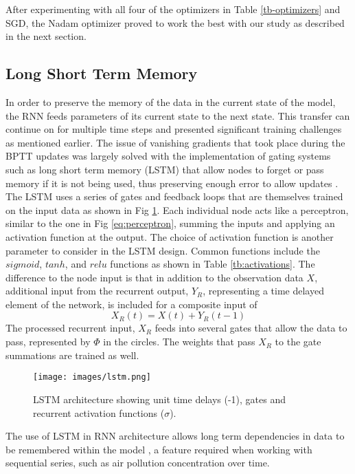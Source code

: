 \documentclass[preprint,12pt,a4paper,authoryear]{elsarticle}
\begin{document}
\begin{linenumbers}
%
After experimenting with all four of the optimizers in Table \ref{tb-optimizers} and SGD, the Nadam optimizer proved to work the best with our study as described in the next section.

\subsection{Long Short Term Memory}

In order to preserve the memory of the data in the current state of the model, the RNN feeds parameters of its current state to the next state. This transfer can continue on for multiple time steps and presented significant training challenges as mentioned earlier. The issue of vanishing gradients that took place during the BPTT updates was largely solved with the implementation of gating systems such as long short term memory (LSTM) that allow nodes to forget or pass memory if it is not being used, thus preserving enough error to allow updates \citep{Hochreiter1997}. The LSTM uses a series of gates and feedback loops that are themselves trained on the input data as shown in Fig \ref{fig:lstm}. Each individual node acts like a perceptron, similar to the one in Fig \ref{eq:perceptron}, summing the inputs and applying an activation function at the output. The choice of activation function is another parameter to consider in the LSTM design. Common functions include the $sigmoid$, $tanh$, and $relu$ functions as shown in Table \ref{tb:activations}. The difference to the node input is that in addition to the observation data $X$, additional input from the recurrent output, $Y_{R}$, representing a time delayed element of the network, is included for a composite input of 
%
\begin{equation}
\label{eq:Xr}
X_{R}(t) = X(t) + Y_{R}(t-1)
\end{equation}
%
The processed recurrent input, $X_{R}$ feeds into several gates that allow the data to pass, represented by $\Phi$ in the circles. The weights that pass $X_{R}$ to the gate summations are trained as well.
%
\begin{figure}[H]
\centering
\texttt{[image: images/lstm.png]} 
\caption{LSTM architecture showing unit time delays (-1), gates and recurrent activation functions ($\sigma$).}
\label{fig:lstm}
\end{figure}
%
The use of LSTM in RNN architecture allows long term dependencies in data to be remembered within the model \citep{Graves2013a}, a feature required when working with sequential series,  such as air pollution concentration over time.


\end{linenumbers}
\end{document}
